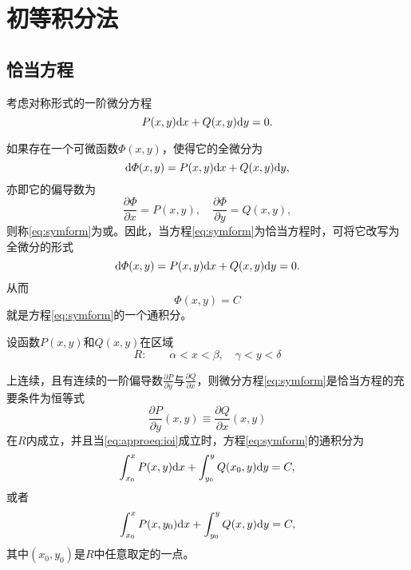 \section{初等积分法}
\subsection{恰当方程}
考虑对称形式的一阶微分方程
\begin{equation}\label{eq:symform}
P(x,y)\mathrm{d} x+Q(x,y)\mathrm{d} y=0.
\end{equation}

如果存在一个可微函数$\varPhi(x,y)$，使得它的全微分为
\[
\mathrm{d}\varPhi(x,y)=P(x,y)\mathrm{d} x+Q(x,y)\mathrm{d} y,
\]
亦即它的偏导数为
\begin{equation}\label{eq:phipartialdiff}
\frac{\partial\varPhi}{\partial x}=P(x,y),\quad\frac{\partial\varPhi}{\partial y}=Q(x,y),
\end{equation}
则称\eqref{eq:symform}为或。因此，当方程\eqref{eq:symform}为恰当方程时，可将它改写为全微分的形式
\begin{equation*}
\mathrm{d}\varPhi(x,y)=P(x,y)\mathrm{d} x+Q(x,y)\mathrm{d} y=0.
\end{equation*}
从而
\begin{equation*}
\varPhi(x,y)=C
\end{equation*}
就是方程\ref{eq:symform}的一个通积分。
\begin{theo}\label{theo:approeq}%
设函数$P(x,y)$和$Q(x,y)$在区域
\[
R:\quad\quad \alpha<x<\beta,\quad\gamma<y<\delta
\]

上连续，且有连续的一阶偏导数$\frac{\partial P}{\partial y}$与$\frac{\partial Q}{\partial x}$，则微分方程\eqref{eq:symform}是恰当方程的充要条件为恒等式
\begin{equation}\label{eq:approeq:ioi}
\frac{\partial P}{\partial y}(x,y)\equiv\frac{\partial Q}{\partial x}(x,y)
\end{equation}
在$R$内成立，并且当\eqref{eq:approeq:ioi}成立时，方程\eqref{eq:symform}的通积分为
\[
\int_{x_0}^xP(x,y)\mathrm{d} x+\int_{y_0}^yQ(x_0,y)\mathrm{d} y=C,
\]
或者
\[
\int_{x_0}^xP(x,y_0)\mathrm{d} x+\int_{y_0}^yQ(x,y)\mathrm{d} y=C,
\]
其中$(x_0,y_0)$是$R$中任意取定的一点。
\end{theo}

